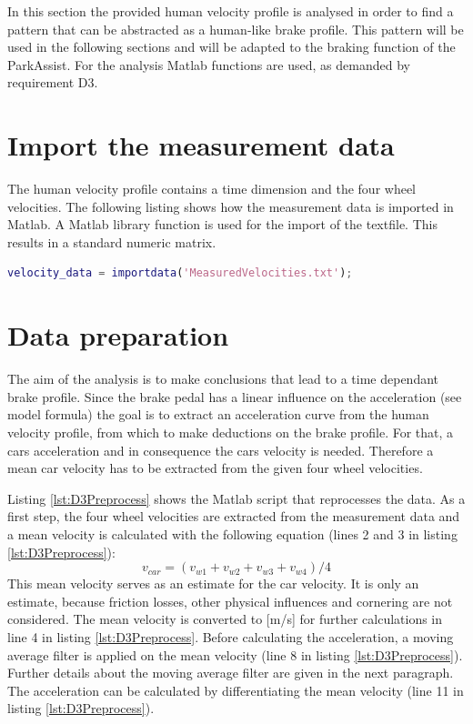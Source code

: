 In this section the provided human velocity profile is analysed in order to find a pattern that can be abstracted as a human-like brake profile.
This pattern will be used in the following sections and will be adapted to the braking function of the ParkAssist.
For the analysis Matlab functions are used, as demanded by requirement D3.
\section{Import the measurement data}
The human velocity profile contains a time dimension and the four wheel velocities.
The following listing shows how the measurement data is imported in Matlab.
A Matlab library function is used for the import of the textfile.
This results in a standard numeric matrix.

\begin{lstlisting}[language=Matlab,basicstyle=\scriptsize	,caption= Import measurement data in Matlab,label= lst:D3Import]
%import velocity data
velocity_data = importdata('MeasuredVelocities.txt');
\end{lstlisting}

\section{Data preparation}
The aim of the analysis is to make conclusions that lead to a time dependant brake profile.
Since the brake pedal has a linear influence on the acceleration (see model formula) the goal is to extract an acceleration curve from the human velocity profile, from which to make deductions on the brake profile.
For that, a cars acceleration and in consequence the cars velocity is needed.
Therefore a mean car velocity has to be extracted from the given four wheel velocities.

Listing \ref{lst:D3Preprocess} shows the Matlab script that reprocesses the data.
As a first step, the four wheel velocities are extracted from the measurement data and a mean velocity is calculated with the following equation (lines 2 and 3 in listing \ref{lst:D3Preprocess}):
\begin{equation}
	v_{car} = (v_{w1} +v_{w2} + v_{w3} +v_{w4})/4
\end{equation}
This mean velocity serves as an estimate for the car velocity.
It is only an estimate, because friction losses, other physical influences and cornering are not considered.
The mean velocity is converted to [m/s] for further calculations in line 4 in listing \ref{lst:D3Preprocess}.
Before calculating the acceleration, a moving average filter is applied on the mean velocity (line 8 in listing \ref{lst:D3Preprocess}). Further details about the moving average filter are given in the next paragraph.
The acceleration can be calculated by differentiating the mean velocity (line 11 in listing \ref{lst:D3Preprocess}).

